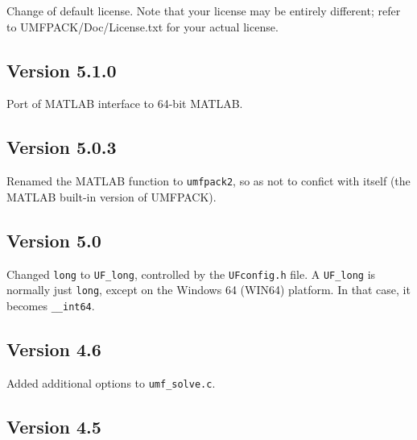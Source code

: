 \documentclass[11pt]{article}
\begin{document}
Change of default license.
Note that your license may be entirely different;
refer to UMFPACK/Doc/License.txt for your actual license.

\subsection{Version 5.1.0}

Port of MATLAB interface to 64-bit MATLAB.

\subsection{Version 5.0.3}

Renamed the MATLAB function to {\tt umfpack2}, so as not to confict with
itself (the MATLAB built-in version of UMFPACK).

\subsection{Version 5.0}

Changed {\tt long} to \verb'UF_long', controlled by the {\tt UFconfig.h}
file.  A \verb'UF_long' is normally just {\tt long}, except on the Windows 64
(WIN64) platform.  In that case, it becomes {\tt \_\_int64}.

\subsection{Version 4.6}

Added additional options to {\tt umf\_solve.c}.

\subsection{Version 4.5}
\end{document}
